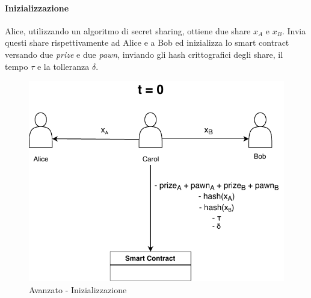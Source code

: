 \paragraph{Inizializzazione}
Alice, utilizzando un algoritmo di secret sharing, ottiene due share
$ x_A $ e $ x_B $. Invia questi share rispettivamente ad Alice e a Bob ed inizializza
lo smart contract versando due \textit{prize} e due \textit{pawn},
inviando gli hash crittografici
degli share, il tempo $ \tau $ e la tolleranza $ \delta $.
\begin{figure}[H]
	\centering
	\includegraphics[width=0.6\linewidth]{images/chap_protocollo/avanzato-creazione.pdf}
	\caption{Avanzato - Inizializzazione}
\end{figure}



